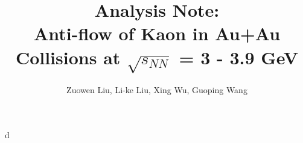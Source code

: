 \documentclass[preprint,showpacs,aps,prc,superscriptaddress]{revtex4-1}
\begin{document}
d

\title{
\Huge{Analysis Note: \\ \textbf{Anti-flow of Kaon in Au+Au Collisions at $\sqrt{s_{NN}}$ = 3 - 3.9 GeV}}
}
\author{\Large{Zuowen Liu, Li-ke Liu, Xing Wu, Guoping Wang}}



\newpage

\maketitle
\tableofcontents

\newpage



\clearpage

\appendix



\end{document}
